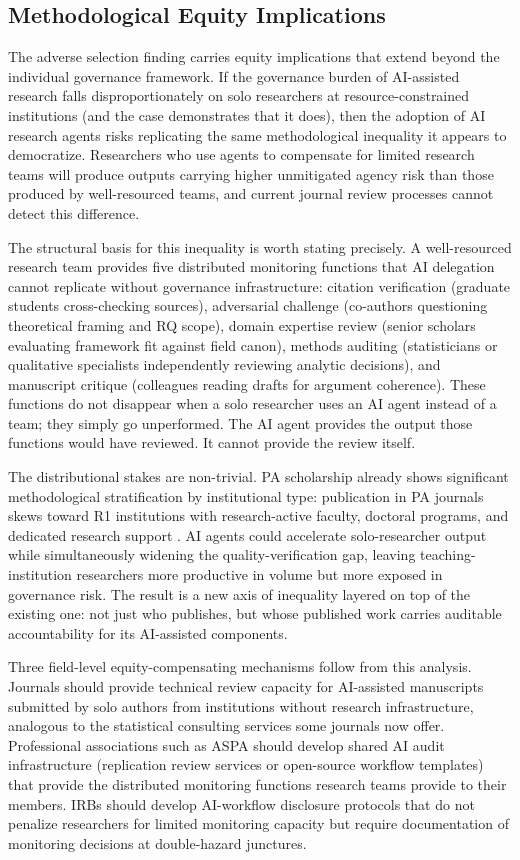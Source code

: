 \documentclass[12pt]{article}
\begin{document}
\subsection{Methodological Equity Implications}

The adverse selection finding carries equity implications that extend beyond the individual
governance framework. If the governance burden of AI-assisted research falls
disproportionately on solo researchers at resource-constrained institutions (and the case
demonstrates that it does), then the adoption of AI research agents risks replicating the
same methodological inequality it appears to democratize. Researchers who use agents to
compensate for limited research teams will produce outputs carrying higher unmitigated
agency risk than those produced by well-resourced teams, and current journal review processes
cannot detect this difference.

The structural basis for this inequality is worth stating precisely. A well-resourced
research team provides five distributed monitoring functions that AI delegation cannot
replicate without governance infrastructure: citation verification (graduate students
cross-checking sources), adversarial challenge (co-authors questioning theoretical
framing and RQ scope), domain expertise review (senior scholars evaluating framework
fit against field canon), methods auditing (statisticians or qualitative specialists
independently reviewing analytic decisions), and manuscript critique (colleagues reading
drafts for argument coherence). These functions do not disappear when a solo researcher
uses an AI agent instead of a team; they simply go unperformed. The AI agent provides
the output those functions would have reviewed. It cannot provide the review itself.

The distributional stakes are non-trivial. PA scholarship already shows significant
methodological stratification by institutional type: publication in PA journals
skews toward R1 institutions with research-active faculty, doctoral programs, and
dedicated research support \citep{ospina2018assessing}. AI agents could accelerate
solo-researcher output while simultaneously widening the quality-verification gap, leaving
teaching-institution researchers more productive in volume but more exposed in governance
risk. The result is a new axis of inequality layered on top of the existing one: not just
who publishes, but whose published work carries auditable accountability for its AI-assisted
components.

Three field-level equity-compensating mechanisms follow from this analysis. Journals should
provide technical review capacity for AI-assisted manuscripts submitted by solo authors from
institutions without research infrastructure, analogous to the statistical consulting
services some journals now offer. Professional associations such as ASPA should develop
shared AI audit infrastructure (replication review services or open-source workflow
templates) that provide the distributed monitoring functions research teams provide to their
members. IRBs should develop AI-workflow disclosure protocols that do not penalize researchers
for limited monitoring capacity but require documentation of monitoring decisions at
double-hazard junctures.
\end{document}
